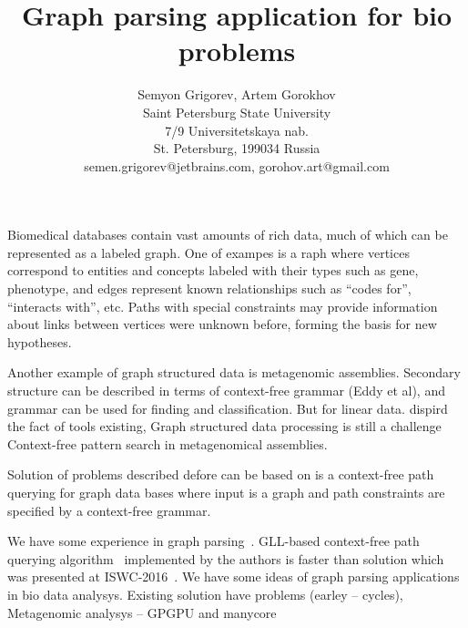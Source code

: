 \documentclass[12pt]{article}  %
\title{Graph parsing application for bio problems}
\author{Semyon Grigorev, Artem Gorokhov
\\
       {Saint Petersburg State University}\\
       {7/9 Universitetskaya nab.}\\
       {St. Petersburg, 199034 Russia}\\
       semen.grigorev@jetbrains.com, gorohov.art@gmail.com
       }
\date{}
\theoremstyle{definition}
\theoremstyle{remark}
\begin{document}
\maketitle

Biomedical databases contain vast amounts of rich data, much of which can be represented as a labeled graph.
One of exampes is a raph where vertices correspond to entities and concepts labeled with their types such as gene, phenotype, and edges represent known relationships such as ``codes for'', ``interacts with'', etc.
Paths with special constraints may provide information about links between vertices were unknown before, forming the basis for new hypotheses.

Another example of graph structured data is metagenomic assemblies.
Secondary structure can be described in terms of context-free grammar (Eddy et al), and grammar can be used for finding and classification.
But for linear data. 
dispird the fact of tools existing, Graph structured data processing is still a challenge
Context-free pattern search in metagenomical assemblies. 

Solution of problems described defore can be based on is a context-free path querying for graph data bases where input is a graph and path constraints are specified by a context-free grammar.


We have some experience in graph parsing~\cite{GraphGLL, RelaxedRNGLR}.
GLL-based context-free path querying algorithm~\cite{GraphGLL} implemented by the authors is faster than solution which was presented at ISWC-2016~\cite{CFRDFParsing}. 
We have some ideas of graph parsing applications in bio data analysys.
Existing solution have problems (earley -- cycles), Metagenomic analysys -- GPGPU and manycore 
\end{document}
